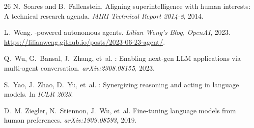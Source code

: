 \documentclass[11pt,a4paper]{article}
\begin{document}
\begin{thebibliography}{26}
N.~Soares and B.~Fallenstein.
\newblock Aligning superintelligence with human interests: A technical research agenda.
\newblock \textit{MIRI Technical Report 2014-8}, 2014.

L.~Weng.
-powered autonomous agents.
\newblock \textit{Lilian Weng's Blog, OpenAI}, 2023.
\newblock \url{https://lilianweng.github.io/posts/2023-06-23-agent/}.

Q.~Wu, G.~Bansal, J.~Zhang, et~al.
: Enabling next-gen {LLM} applications via multi-agent conversation.
\newblock \textit{arXiv:2308.08155}, 2023.

S.~Yao, J.~Zhao, D.~Yu, et~al.
: Synergizing reasoning and acting in language models.
\newblock In \textit{ICLR 2023}.

D.~M. Ziegler, N.~Stiennon, J.~Wu, et~al.
\newblock Fine-tuning language models from human preferences.
\newblock \textit{arXiv:1909.08593}, 2019.

\end{thebibliography}
\end{document}
